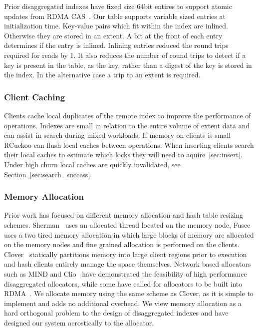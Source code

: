 Prior disaggregated indexes have fixed size 64bit entires to
support atomic updates from RDMA
CAS~\cite{fusee,race,rolex}. Our table supports variable
sized entries at initialization time. Key-value pairs which
fit within the index are inlined. Otherwise they are stored
in an extent. A bit at the front of each entry determines if
the entry is inlined. Inlining entries reduced the round
trips required for reads by 1. It also reduces the number of
round trips to detect if a key is present in the table, as
the key, rather than a digest of the key is stored in the
index. In the alternative case a trip to an extent is
required.

\subsubsection{Client Caching}

Clients cache local duplicates of the remote index to
improve the performance of operations. Indexes are small in
relation to the entire volume of extent data and can assist
in search during mixed workloads. If memory on clients is
small RCuckoo can flush local caches between operations.
When inserting clients search their local caches to estimate
which locks they will need to aquire~\ref{sec:insert}. Under
high churn local caches are quickly invalidated, see
Section~\ref{sec:search_success}.


\subsubsection{Memory Allocation}

Prior work has focused on different memory allocation and
hash table resizing schemes. Sherman~\cite{sherman} uses an
allocated thread located on the memory node,
Fusee~\cite{fusee} uses a two tired memory allocation in
which large blocks of memory are allocated on the memory
nodes and fine grained allocation is performed on the
clients. Clover~\cite{clover} statically partitions memory
into large client regions prior to execution and hash
clients entirely manage the space themselves. Network based
allocators such as MIND and Clio~\cite{mind,clio} have
demonstrated the feasibility of high performance
disaggregated allocators, while some have called for
allocators to be built into RDMA~\cite{prism}. We allocate
memory using the same scheme as Clover, as it is simple to
implement and adds no additional overhead. We view memory
allocation as a hard orthogonal problem to the design of
disaggregated indexes and have designed our system
acrostically to the allocator.





